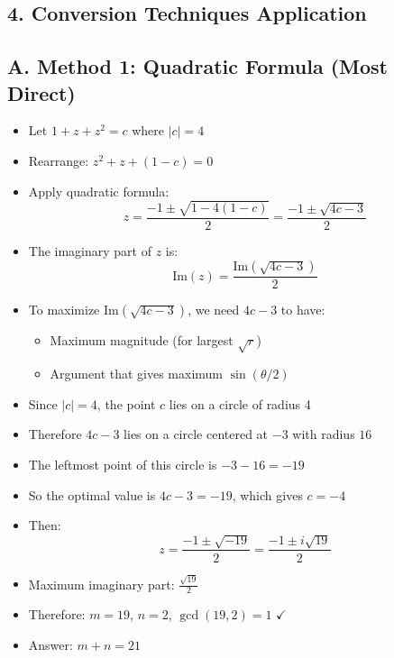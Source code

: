 \documentclass[11pt]{article}
\begin{document}
\begin{conversionbox}
\section*{4. Conversion Techniques Application}

\subsection*{A. Method 1: Quadratic Formula (Most Direct)}
\begin{itemize}[leftmargin=*]
    \item Let $1+z+z^2 = c$ where $|c| = 4$
    \item Rearrange: $z^2 + z + (1-c) = 0$
    \item Apply quadratic formula:
    \[z = \frac{-1 \pm \sqrt{1 - 4(1-c)}}{2} = \frac{-1 \pm \sqrt{4c-3}}{2}\]
    \item The imaginary part of $z$ is:
    \[\text{Im}(z) = \frac{\text{Im}(\sqrt{4c-3})}{2}\]
    \item To maximize $\text{Im}(\sqrt{4c-3})$, we need $4c-3$ to have:
    \begin{itemize}
        \item Maximum magnitude (for largest $\sqrt{r}$)
        \item Argument that gives maximum $\sin(\theta/2)$
    \end{itemize}
    \item Since $|c| = 4$, the point $c$ lies on a circle of radius 4
    \item Therefore $4c - 3$ lies on a circle centered at $-3$ with radius $16$
    \item The leftmost point of this circle is $-3 - 16 = -19$
    \item So the optimal value is $4c - 3 = -19$, which gives $c = -4$
    \item Then:
    \[z = \frac{-1 \pm \sqrt{-19}}{2} = \frac{-1 \pm i\sqrt{19}}{2}\]
    \item Maximum imaginary part: $\frac{\sqrt{19}}{2}$
    \item Therefore: $m = 19$, $n = 2$, $\gcd(19,2) = 1$ $\checkmark$
    \item Answer: $m + n = 21$
\end{itemize}


\end{conversionbox}
\end{document}
